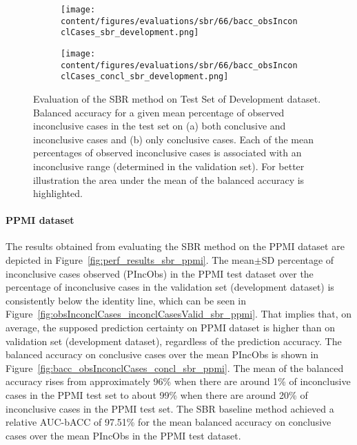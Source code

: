 \begin{figure}[ht]
    \begin{subfigure}{0.5\textwidth}
      \centering
      \texttt{[image: content/figures/evaluations/sbr/66/bacc\_obsInconclCases\_sbr\_development.png]}
      \subcaption{}
      \label{fig:bacc_obsInconclCases_sbr_development}
    \end{subfigure}
    \hfill
    \begin{subfigure}{0.5\textwidth}
      \centering
      \texttt{[image: content/figures/evaluations/sbr/66/bacc\_obsInconclCases\_concl\_sbr\_development.png]}
      \subcaption{}
      \label{fig:bacc_obsInconclCases_concl_sbr_development}
    \end{subfigure}

    \caption{Evaluation of the SBR method on Test Set of Development dataset.
    Balanced accuracy for a given mean percentage of observed inconclusive cases in the test set on 
    (a) both conclusive and inconclusive cases and (b) only conclusive cases. 
    Each of the mean percentages of observed inconclusive cases is associated with an inconclusive range (determined in the validation set).
    For better illustration the area under the mean of the balanced accuracy is highlighted.}
    \label{fig:bacc_obsInconclCases_sbr_development_full}
\end{figure}




\paragraph{PPMI dataset}

The results obtained from evaluating the SBR method on the PPMI dataset 
are depicted in Figure~\ref{fig:perf_results_sbr_ppmi}.
The mean$\pm$SD percentage of inconclusive cases observed (PIncObs) in the PPMI test dataset 
over the percentage of inconclusive cases in the validation set (development dataset) 
is consistently below the identity line, 
which can be seen in Figure~\ref{fig:obsInconclCases_inconclCasesValid_sbr_ppmi}.
That implies that, on average, the supposed prediction certainty on PPMI dataset is higher than on validation set (development dataset),
regardless of the prediction accuracy.
The balanced accuracy on conclusive cases over the mean PIncObs is shown 
in Figure~\ref{fig:bacc_obsInconclCases_concl_sbr_ppmi}.
The mean of the balanced accuracy rises from approximately 96\% 
when there are around 1\% of inconclusive cases in the PPMI test set to about 99\% 
when there are around 20\% of inconclusive cases in the PPMI test set.
The SBR baseline method achieved a relative AUC-bACC of 97.51\% for the mean balanced accuracy on conclusive cases 
over the mean PIncObs in the PPMI test dataset.


